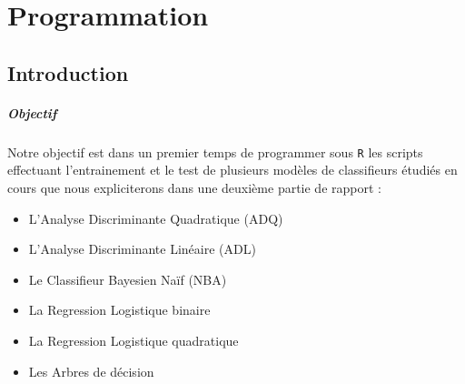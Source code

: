 \documentclass{report}
\begin{document}
\chapter{Programmation}
\section{Introduction}
\paragraph{Objectif}
Notre objectif est dans un premier temps de programmer sous \verb+R+ les scripts effectuant l'entrainement et le test de plusieurs modèles de classifieurs étudiés en cours que nous expliciterons dans une deuxième partie de rapport :

\begin{itemize}
    \item L'Analyse Discriminante Quadratique (ADQ)
    \item L'Analyse Discriminante Linéaire (ADL)
    \item Le Classifieur Bayesien Naïf (NBA)
    \item La Regression Logistique binaire
    \item La Regression Logistique quadratique
    \item Les Arbres de décision
\end{itemize}
\end{document}
